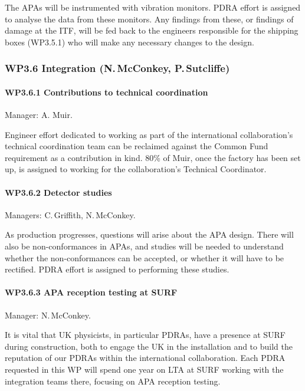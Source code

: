 The APAs will be instrumented with vibration monitors. PDRA effort is assigned to analyse the data from these monitors. Any findings from these, or findings of damage at the ITF, will be fed back to the engineers responsible for the shipping boxes (WP3.5.1) who will make any necessary changes to the design.

\subsubsection{WP3.6 Integration (N.\,McConkey, P.\,Sutcliffe)}

\paragraph{WP3.6.1 Contributions to technical coordination} Manager: A. Muir.

Engineer effort dedicated to working as part of the international collaboration's technical coordination team can be reclaimed against the Common Fund requirement as a contribution in kind. 80\% of Muir, once the factory has been set up, is assigned to working for the collaboration's Technical Coordinator.

\paragraph{WP3.6.2 Detector studies} Managers: C.\,Griffith, N.\,McConkey.

As production progresses, questions will arise about the APA design. There will also be non-conformances in APAs, and studies will be needed to understand whether the non-conformances can be accepted, or whether it will have to be rectified. PDRA effort is assigned to performing these studies.

\paragraph{WP3.6.3 APA reception testing at SURF} Manager: N.\,McConkey.

It is vital that UK physicists, in particular PDRAs, have a presence at SURF during construction, both to engage the UK in the installation and to build the reputation of our PDRAs within the international collaboration. Each PDRA requested in this WP will spend one year on LTA at SURF working with the integration teams there, focusing on APA reception testing.

